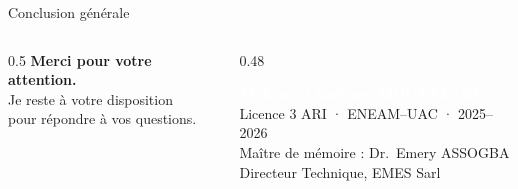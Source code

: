\documentclass[aspectratio=169, 10pt]{beamer}
\begin{document}
{\begin{frame}{Conclusion générale}
  \vspace{0.5cm}
  \vspace{0.3cm}

  \begin{columns}[T]
    \begin{column}{0.5\textwidth}
      {\Large\textbf{\textcolor{EMESlightblue}{Merci pour votre attention.}}}\\[6pt]
      {\small\textcolor{white!60}{Je reste à votre disposition\\pour répondre à vos questions.}}
    \end{column}
    \begin{column}{0.48\textwidth}
      \begin{flushright}
        {\small\textbf{\textcolor{white}{Mohamed Saobane MOUTALABI}}}\\
        {\tiny\textcolor{white!60}{Licence 3 ARI · ENEAM--UAC · 2025--2026}}\\[4pt]
        {\tiny\textcolor{white!50}{Maître de mémoire : Dr.~Emery ASSOGBA}}\\
        {\tiny\textcolor{white!50}{Directeur Technique, EMES Sarl}}
      \end{flushright}
    \end{column}
  \end{columns}

  \vspace{0.2cm}
\end{frame}
}

\end{document}
